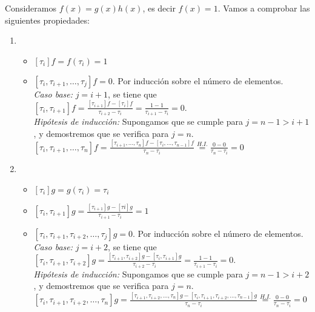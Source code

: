 \documentclass[12pt,a4paper]{article}
\begin{document}
Consideramos $f(x)=g(x)h(x)$, es decir $f(x)=1$. Vamos a comprobar las
siguientes propiedades:
\begin{enumerate}
\item 
  \begin{itemize}
  \item $[\tau_i]f=f(\tau_i)=1$
  \item $[\tau_i, \tau_{i+1}, \dots, \tau_j]f = 0$. Por inducción sobre el
    número de elementos.\\
    \textit{Caso base:} $j=i+1$, se tiene que $[\tau_i,\tau_{i+1}]f =
    \frac{[\tau_{i+1}]f -[\tau_i]f}{\tau_{i+2}-\tau_{i}} = \frac{1 -
      1}{\tau_{i+1} - \tau_i} = 0.$\\
    \textit{Hipótesis de inducción:} Supongamos que se cumple para $j=n-1>i+1$, y
    demostremos que se verifica para $j=n$.\\
    $[\tau_i, \tau_{i+1},\dots,\tau_{n}] f =
    \frac{[\tau_{i+1},\dots,\tau_n]f -
      [\tau_i,\dots,\tau_{n-1}]f}{\tau_n-\tau_i} \stackrel{H.I.}{=} \frac{0-0}{\tau_n -
      \tau_i}=0$
  \end{itemize}
\item 
  \begin{itemize}
  \item $[\tau_i]g=g(\tau_i)=\tau_i$
  \item $[\tau_i,\tau_{i+1}]g=\frac{[\tau_{i+1}]g-[\tau{i}]g}{\tau_{i+1}-\tau_{i}}=1$
  \item $[\tau_i, \tau_{i+1}, \tau_{i+2}, \dots, \tau_j]g = 0$. Por inducción sobre el
    número de elementos.\\
    \textit{Caso base:} $j=i+2$, se tiene que $[\tau_i,\tau_{i+1},\tau_{i+2}]g =
    \frac{[\tau_{i+1},\tau_{i+2}]g -[\tau_i,\tau_{i+1}]g}{\tau_{i+2}-\tau_{i}} = \frac{1 -
      1}{\tau_{i+1} - \tau_i} = 0.$\\
    \textit{Hipótesis de inducción:} Supongamos que se cumple para $j=n-1>i+2$, y
    demostremos que se verifica para $j=n$.\\
    $[\tau_i, \tau_{i+1}, \tau_{i+2},\dots,\tau_{n}] g =
    \frac{[\tau_{i+1}, \tau_{i+2},\dots,\tau_n]g -
      [\tau_i,\tau_{i+1},\tau_{i+2},\dots,\tau_{n-1}]g}{\tau_n-\tau_i} \stackrel{H.I.}{=} \frac{0-0}{\tau_n -
      \tau_i}=0$
  \end{itemize}
\end{enumerate}
\end{document}
